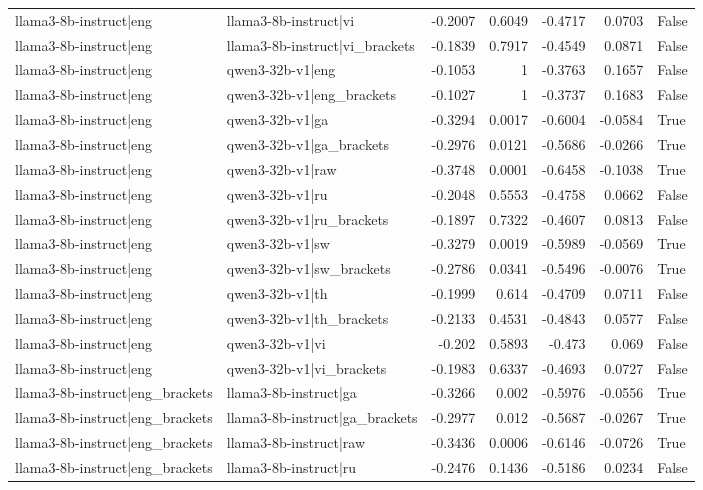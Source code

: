 \begin{table}
\begin{tabular}{l l r r r r l}
llama3-8b-instruct|eng & llama3-8b-instruct|vi & -0.2007 & 0.6049 & -0.4717 & 0.0703 & False \\
llama3-8b-instruct|eng & llama3-8b-instruct|vi_brackets & -0.1839 & 0.7917 & -0.4549 & 0.0871 & False \\
llama3-8b-instruct|eng & qwen3-32b-v1|eng & -0.1053 & 1 & -0.3763 & 0.1657 & False \\
llama3-8b-instruct|eng & qwen3-32b-v1|eng_brackets & -0.1027 & 1 & -0.3737 & 0.1683 & False \\
llama3-8b-instruct|eng & qwen3-32b-v1|ga & -0.3294 & 0.0017 & -0.6004 & -0.0584 & True \\
llama3-8b-instruct|eng & qwen3-32b-v1|ga_brackets & -0.2976 & 0.0121 & -0.5686 & -0.0266 & True \\
llama3-8b-instruct|eng & qwen3-32b-v1|raw & -0.3748 & 0.0001 & -0.6458 & -0.1038 & True \\
llama3-8b-instruct|eng & qwen3-32b-v1|ru & -0.2048 & 0.5553 & -0.4758 & 0.0662 & False \\
llama3-8b-instruct|eng & qwen3-32b-v1|ru_brackets & -0.1897 & 0.7322 & -0.4607 & 0.0813 & False \\
llama3-8b-instruct|eng & qwen3-32b-v1|sw & -0.3279 & 0.0019 & -0.5989 & -0.0569 & True \\
llama3-8b-instruct|eng & qwen3-32b-v1|sw_brackets & -0.2786 & 0.0341 & -0.5496 & -0.0076 & True \\
llama3-8b-instruct|eng & qwen3-32b-v1|th & -0.1999 & 0.614 & -0.4709 & 0.0711 & False \\
llama3-8b-instruct|eng & qwen3-32b-v1|th_brackets & -0.2133 & 0.4531 & -0.4843 & 0.0577 & False \\
llama3-8b-instruct|eng & qwen3-32b-v1|vi & -0.202 & 0.5893 & -0.473 & 0.069 & False \\
llama3-8b-instruct|eng & qwen3-32b-v1|vi_brackets & -0.1983 & 0.6337 & -0.4693 & 0.0727 & False \\
llama3-8b-instruct|eng_brackets & llama3-8b-instruct|ga & -0.3266 & 0.002 & -0.5976 & -0.0556 & True \\
llama3-8b-instruct|eng_brackets & llama3-8b-instruct|ga_brackets & -0.2977 & 0.012 & -0.5687 & -0.0267 & True \\
llama3-8b-instruct|eng_brackets & llama3-8b-instruct|raw & -0.3436 & 0.0006 & -0.6146 & -0.0726 & True \\
llama3-8b-instruct|eng_brackets & llama3-8b-instruct|ru & -0.2476 & 0.1436 & -0.5186 & 0.0234 & False \\

\end{tabular}
\end{table}
